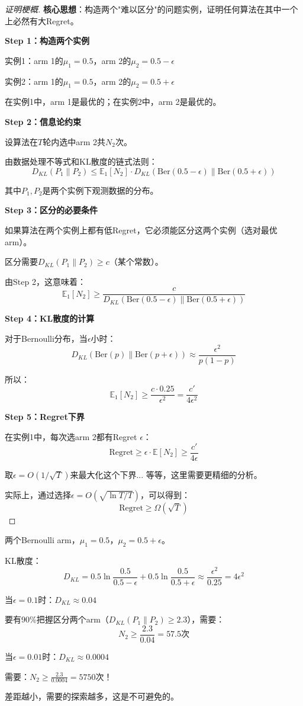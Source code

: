 \documentclass[11pt,a4paper]{article}
\theoremstyle{definition}
\begin{document}
\begin{proof}[证明梗概]
\textbf{核心思想}：构造两个"难以区分"的问题实例，证明任何算法在其中一个上必然有大Regret。

\textbf{Step 1：构造两个实例}

实例1：arm 1的$\mu_1 = 0.5$，arm 2的$\mu_2 = 0.5 - \epsilon$

实例2：arm 1的$\mu_1 = 0.5$，arm 2的$\mu_2 = 0.5 + \epsilon$

在实例1中，arm 1是最优的；在实例2中，arm 2是最优的。

\textbf{Step 2：信息论约束}

设算法在$T$轮内选中arm 2共$N_2$次。

由数据处理不等式和KL散度的链式法则：
\[
D_{KL}(P_1 \| P_2) \leq \mathbb{E}_1[N_2] \cdot D_{KL}(\text{Ber}(0.5-\epsilon) \| \text{Ber}(0.5+\epsilon))
\]

其中$P_1, P_2$是两个实例下观测数据的分布。

\textbf{Step 3：区分的必要条件}

如果算法在两个实例上都有低Regret，它必须能区分这两个实例（选对最优arm）。

区分需要$D_{KL}(P_1 \| P_2) \geq c$（某个常数）。

由Step 2，这意味着：
\[
\mathbb{E}_1[N_2] \geq \frac{c}{D_{KL}(\text{Ber}(0.5-\epsilon) \| \text{Ber}(0.5+\epsilon))}
\]

\textbf{Step 4：KL散度的计算}

对于Bernoulli分布，当$\epsilon$小时：
\[
D_{KL}(\text{Ber}(p) \| \text{Ber}(p+\epsilon)) \approx \frac{\epsilon^2}{p(1-p)}
\]

所以：
\[
\mathbb{E}_1[N_2] \geq \frac{c \cdot 0.25}{\epsilon^2} = \frac{c'}{4\epsilon^2}
\]

\textbf{Step 5：Regret下界}

在实例1中，每次选arm 2都有Regret $\epsilon$：
\[
\text{Regret} \geq \epsilon \cdot \mathbb{E}[N_2] \geq \frac{c'}{4\epsilon}
\]

取$\epsilon = O(1/\sqrt{T})$来最大化这个下界... 等等，这里需要更精细的分析。

实际上，通过选择$\epsilon = O(\sqrt{\ln T / T})$，可以得到：
\[
\text{Regret} \geq \Omega(\sqrt{T})
\]
\end{proof}

\begin{calculation}[具体数值感受]
两个Bernoulli arm，$\mu_1 = 0.5$，$\mu_2 = 0.5 + \epsilon$。

KL散度：
\[
D_{KL} = 0.5\ln\frac{0.5}{0.5-\epsilon} + 0.5\ln\frac{0.5}{0.5+\epsilon} \approx \frac{\epsilon^2}{0.25} = 4\epsilon^2
\]

当$\epsilon = 0.1$时：$D_{KL} \approx 0.04$

要有90\%把握区分两个arm（$D_{KL}(P_1 \| P_2) \geq 2.3$），需要：
\[
N_2 \geq \frac{2.3}{0.04} = 57.5 \text{次}
\]

当$\epsilon = 0.01$时：$D_{KL} \approx 0.0004$

需要：$N_2 \geq \frac{2.3}{0.0004} = 5750$次！

差距越小，需要的探索越多，这是不可避免的。
\end{calculation}
\end{document}
